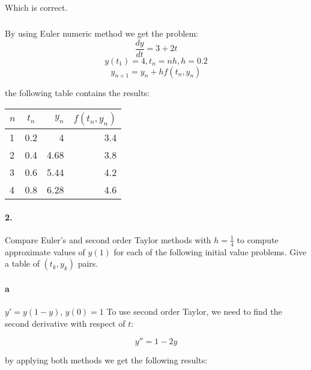 \documentclass{article}
\begin{document}
Which is correct.

\subparagraph{} By using Euler numeric method we get the problem:
\[
    \frac{dy}{dt} = 3 + 2t
\]
\[
    y(t_1) = 4, t_n = nh, h = 0.2
\]
\[
    y_{n+1} = y_n + hf(t_n,y_n)
\]

the following table contains the results:

\begin{table}[ht]
  \begin{center}
    \label{tab:1.c}
    \begin{tabular}{l|c|r|r} %
      $n$&$t_n$&$y_n$&$f(t_n,y_n)$\\
      \hline
        1&0.2&4&3.4\\
        2&0.4&4.68&3.8\\
        3&0.6&5.44&4.2\\
        4&0.8&6.28&4.6\\
    \end{tabular}
  \end{center}
\end{table}

\newpage

\paragraph{2.} Compare  Euler's and second order Taylor methods with $h = \frac{1}{4}$ to compute approximate values of $y(1)$ for each of the following initial value problems. Give a table of $(t_k, y_k)$ pairs.

\paragraph{a} $y' = y(1-y)$, $y(0)=1$\newline
To use second order Taylor, we need to find the second derivative with respect of $t$:

\[
    y'' = 1 - 2y
\]

by applying both methods we get the following results:
\end{document}
